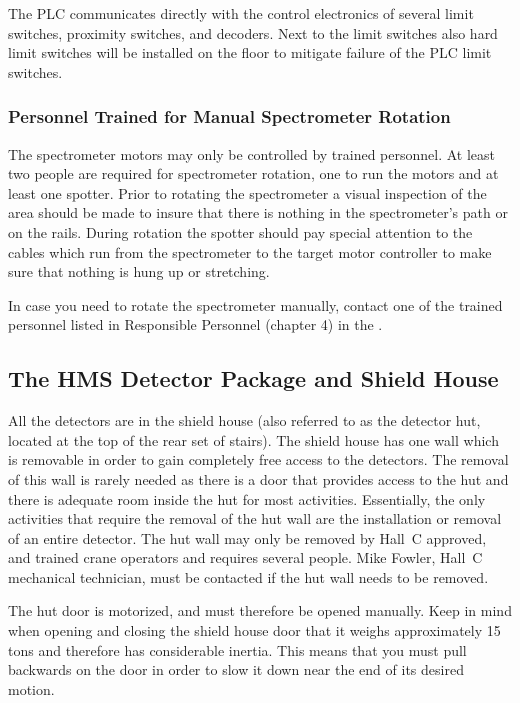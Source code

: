 The PLC communicates directly with the control electronics of several limit
switches, proximity switches, and decoders. Next to the limit switches
also hard limit switches will be installed on the floor to mitigate failure
of the PLC limit switches.


\subsubsection{Personnel Trained for Manual Spectrometer Rotation}

The spectrometer motors may only be controlled by trained personnel.
At least two people are required for spectrometer rotation, one to
run the motors and at least one spotter. Prior to rotating the spectrometer
a visual inspection of the area should be made to insure that there
is nothing in the spectrometer's path or on the rails. During rotation
the spotter should pay special attention to
the cables which run from the
spectrometer to the target motor controller to make sure that
nothing is hung up or stretching.

In case you need to rotate the spectrometer manually, contact one of the trained
personnel listed in Responsible Personnel (chapter 4) in
the .

\subsection{The HMS Detector Package and Shield House }

All the detectors are in the shield house (also referred to as the detector hut,
located at the top of the
rear set of stairs). The shield house has one wall which is removable
in order to gain completely free access to the detectors. The removal
of this wall is rarely needed as there is a door that provides access
to the hut and there is adequate room inside the hut for most activities.
Essentially, the only activities that require the removal of the hut
wall are the installation or removal of an entire detector. The
hut wall may only be removed by Hall~C approved, and trained crane
operators and requires
several people. Mike Fowler, Hall~C mechanical technician,  
must be contacted if the hut wall needs to be removed.

The hut door is motorized, and must therefore be opened manually. Keep in mind when opening and closing the
shield house door that it weighs approximately 15 tons and therefore has
considerable inertia. This means that you must pull backwards on the door
in order to slow it down near the end of its desired motion.

